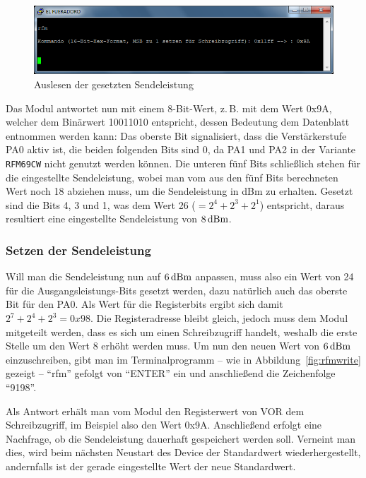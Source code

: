 \documentclass[pdftex, parskip, numbers=noenddot, toc=listof]{scrbook}
\begin{document}
	\begin{figure}
		\centering
		\includegraphics[width=.8\textwidth]{Bilder/rfmbefehl}
		\caption{Auslesen der gesetzten Sendeleistung}
		\label{fig:rfmread}
	\end{figure}

	Das Modul antwortet nun mit einem 8-Bit-Wert, z.\,B. mit dem Wert 0x9A, welcher dem Binärwert 10011010 entspricht, dessen Bedeutung dem Datenblatt entnommen werden kann: Das oberste Bit signalisiert, dass die Verstärkerstufe PA0 aktiv ist, die beiden folgenden Bits sind 0, da PA1 und PA2 in der Variante \texttt{RFM69CW} nicht genutzt werden können. Die unteren fünf Bits schließlich stehen für die eingestellte Sendeleistung, wobei man vom aus den fünf Bits berechneten Wert noch 18 abziehen muss, um die Sendeleistung in dBm zu erhalten. Gesetzt sind die Bits 4, 3 und 1, was dem Wert 26 ($= 2^4 + 2^3 + 2^1$) entspricht, daraus resultiert eine eingestellte Sendeleistung von $\unit[8]{dBm}$.

	\subsubsection{Setzen der Sendeleistung}

	Will man die Sendeleistung nun auf $\unit[6]{dBm}$ anpassen, muss also ein Wert von 24 für die Aus\-gangs\-lei\-stungs-Bits gesetzt werden, dazu natürlich auch das oberste Bit für den PA0. Als Wert für die Registerbits ergibt sich damit $2^7 + 2^4 + 2^3 = 0x98$. Die Registeradresse bleibt gleich, jedoch muss dem Modul mitgeteilt werden, dass es sich um einen Schreibzugriff handelt, weshalb die erste Stelle um den Wert 8 erhöht werden muss. Um nun den neuen Wert von $\unit[6]{dBm}$ einzuschreiben, gibt man im Terminalprogramm -- wie in Abbildung~\ref{fig:rfmwrite} gezeigt -- \enquote{rfm} gefolgt von \enquote{ENTER} ein und anschließend die Zeichenfolge \enquote{9198}.

	Als Antwort erhält man vom Modul den Registerwert von VOR dem Schreibzugriff, im Beispiel also den Wert 0x9A. Anschließend erfolgt eine Nachfrage, ob die Sendeleistung dauerhaft gespeichert werden soll. Verneint man dies, wird beim nächsten Neustart des Device der Standardwert wiederhergestellt, andernfalls ist der gerade eingestellte Wert der neue Standardwert.
\end{document}
